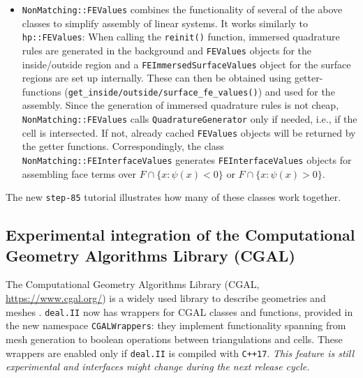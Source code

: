 \documentclass{ansarticle-preprint}
\newcommand{\specialword}[1]{\texttt{#1}}
\newcommand{\dealii}{{\specialword{deal.II}}\xspace}
\begin{document}
\begin{itemize}
  \item \texttt{NonMatching::FEValues} combines the functionality of
    several of the above classes to simplify assembly of linear systems. It works similarly to \texttt{hp::FEValues}:
  When calling the \texttt{reinit()} function, immersed quadrature rules are generated in the background and
  \texttt{FEValues} objects for the inside/outside region and a \texttt{FEImmersedSurfaceValues} object for the surface regions are set up internally. These can then be obtained using getter-functions (\texttt{get\_inside/outside/surface\_fe\_values()}) and used for the assembly.
  Since the generation of immersed quadrature rules is not cheap,
  \texttt{NonMatching::FEValues} calls  \texttt{QuadratureGenerator} only if needed, i.e., if the cell is intersected. If not, already cached \texttt{FEValues} objects will be returned by the getter functions.
  Correspondingly, the class \texttt{NonMatching::FEInterfaceValues} generates
  \texttt{FEInterfaceValues} objects for assembling face terms over $F \cap \{x : \psi(x) < 0 \}$ or $F \cap \{x : \psi(x) > 0 \}$.
\end{itemize}
The new \texttt{step-85} tutorial illustrates how many of these classes work together.




\subsection{Experimental integration of the Computational Geometry Algorithms
  Library (CGAL)}\label{sec:cgalwrappers}

The Computational Geometry Algorithms Library (CGAL, \url{https://www.cgal.org/}) is a widely used
library to describe geometries and meshes \cite{cgal-user-ref}. \dealii now
has wrappers for CGAL classes and functions, provided in the new
namespace \texttt{CGALWrappers}: they implement functionality
spanning from mesh generation to boolean operations between
triangulations and cells. These wrappers are enabled only if \dealii
is compiled with \texttt{C++17}. \textit{This feature is still experimental and
interfaces might change during the next release cycle.}
\end{document}

